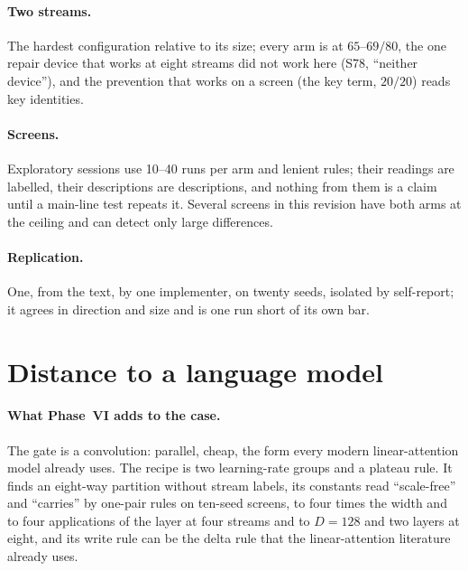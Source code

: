 \documentclass[11pt]{article}
\begin{document}
\paragraph{Two streams.} The hardest configuration relative to its size; every arm is at $65$--$69/80$, the one repair device that works at eight streams did not work here (S78, ``neither device''), and the prevention that works on a screen (the key term, $20/20$) reads key identities.

\paragraph{Screens.} Exploratory sessions use 10--40 runs per arm and lenient rules; their readings are labelled, their descriptions are descriptions, and nothing from them is a claim until a main-line test repeats it. Several screens in this revision have both arms at the ceiling and can detect only large differences.

\paragraph{Replication.} One, from the text, by one implementer, on twenty seeds, isolated by self-report; it agrees in direction and size and is one run short of its own bar.

\section{Distance to a language model}
\label{sec:lm}

\paragraph{What Phase~VI adds to the case.} The gate is a convolution: parallel, cheap, the form every modern linear-attention model already uses. The recipe is two learning-rate groups and a plateau rule. It finds an eight-way partition without stream labels, its constants read ``scale-free'' and ``carries'' by one-pair rules on ten-seed screens, to four times the width and to four applications of the layer at four streams and to $D = 128$ and two layers at eight, and its write rule can be the delta rule that the linear-attention literature already uses.
\end{document}
